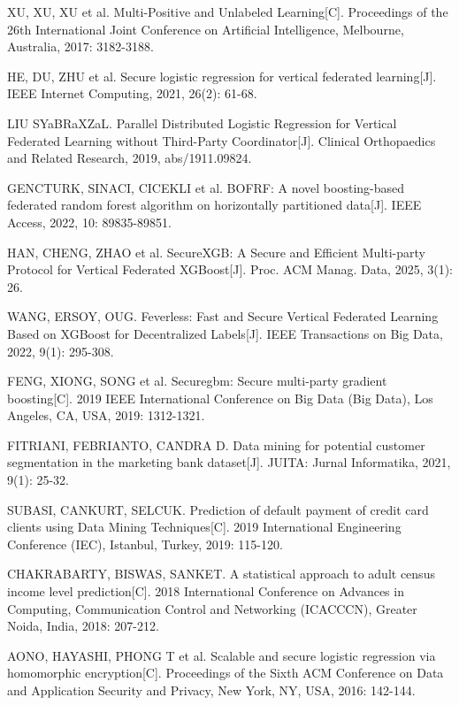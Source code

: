 \begin{thebibliography}{200}
	XU, XU, XU et al. Multi-Positive and Unlabeled Learning[C]. Proceedings of the 26th International Joint Conference on Artificial Intelligence, Melbourne, Australia, 2017: 3182-3188.
	
	HE, DU, ZHU et al. Secure logistic regression for vertical federated learning[J]. IEEE Internet Computing, 2021, 26(2): 61-68.
	
	LIU SYaBRaXZaL. Parallel Distributed Logistic Regression for Vertical Federated Learning
	without Third-Party Coordinator[J]. Clinical Orthopaedics and Related Research, 2019, abs/1911.09824.
	
	GENCTURK, SINACI, CICEKLI et al. BOFRF: A novel boosting-based federated random forest algorithm on horizontally partitioned data[J]. IEEE Access, 2022, 10: 89835-89851.
	
	HAN, CHENG, ZHAO et al. SecureXGB: A Secure and Efficient Multi-party Protocol for Vertical Federated XGBoost[J]. Proc. ACM Manag. Data, 2025, 3(1): 26.
	
	WANG, ERSOY, OUG. Feverless: Fast and Secure Vertical Federated Learning Based on XGBoost for Decentralized Labels[J]. IEEE Transactions on Big Data, 2022, 9(1): 295-308.
	
	FENG, XIONG, SONG et al. Securegbm: Secure multi-party gradient boosting[C]. 2019 IEEE International Conference on Big Data (Big Data), Los Angeles, CA, USA, 2019: 1312-1321.
	
	FITRIANI, FEBRIANTO, CANDRA D. Data mining for potential customer segmentation in the marketing bank dataset[J]. JUITA: Jurnal Informatika, 2021, 9(1): 25-32.
	
	SUBASI, CANKURT, SELCUK. Prediction of default payment of credit card clients using Data Mining Techniques[C]. 2019 International Engineering Conference (IEC), Istanbul, Turkey, 2019: 115-120.
	
	CHAKRABARTY, BISWAS, SANKET. A statistical approach to adult census income level prediction[C]. 2018 International Conference on Advances in Computing, Communication Control and Networking (ICACCCN), Greater Noida, India, 2018: 207-212.
	
	AONO, HAYASHI, PHONG T et al. Scalable and secure logistic regression via homomorphic encryption[C]. Proceedings of the Sixth ACM Conference on Data and Application Security and Privacy, New York, NY, USA, 2016: 142-144.
	

\end{thebibliography}
